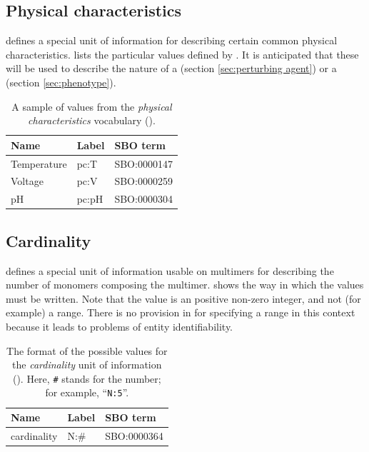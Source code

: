 \subsection{Physical characteristics}
\label{sec:physical-characteristics-cv}

\SBGNPDLone defines a special unit of information for describing certain common physical characteristics.   lists the particular values defined by \SBGNPDLone.  %
It is anticipated that these will be used to describe the nature of a  (section \ref{sec:perturbing agent}) or a  (section \ref{sec:phenotype}).

\begin{table}[h]
  \centering
  \begin{tabular}{l>{\ttfamily}l>{\ttfamily}l}
    \toprule
    \textbf{Name}   & \textbf{\rmfamily Label} & \textbf{\rmfamily SBO term} \\
    \midrule
    Temperature   & pc:T  & SBO:0000147\\
    Voltage       & pc:V  & SBO:0000259\\
    pH            & pc:pH & SBO:0000304\\
    \bottomrule
  \end{tabular}
  \caption{A sample of values from the \emph{physical
      characteristics} vocabulary ().}
  \label{tab:physical-characteristics-cv}
\end{table}


\subsection{Cardinality}
\label{sec:cardinality-cv}

\SBGNPDLone defines a special unit of information usable on multimers for describing the number of monomers composing the multimer.   shows the way in which the values must be written.  Note that the value is an positive non-zero integer, and not (for example) a range.  There is no provision in \SBGNPDLone for specifying a range in this context because it leads to problems of entity identifiability.

\begin{table}[h]
  \centering
  \begin{tabular}{l>{\ttfamily}l>{\ttfamily}l}
    \toprule
    \textbf{Name}   & \textbf{\rmfamily Label} & \textbf{\rmfamily SBO term} \\
    \midrule
    cardinality    & N:\#  & SBO:0000364\\
    \bottomrule
  \end{tabular}
  \caption{The format of the possible values for the
    \emph{cardinality} unit of information
    ().  Here, \texttt{\#} stands for the
    number; for example, ``\texttt{N:5}''.}
  \label{tab:cardinality-cv}
\end{table}

